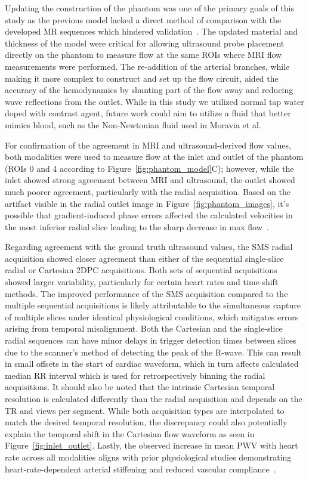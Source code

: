 Updating the construction of the phantom was one of the primary goals of this study as the previous model lacked a direct method of comparison with the developed MR sequences which hindered validation~\cite{robertsAdvancingFunctionalAssessment2023}. The updated material and thickness of the model were critical for allowing ultrasound probe placement directly on the phantom to measure flow at the same ROIs where MRI flow measurements were performed. The re-addition of the arterial branches, while making it more complex to construct and set up the flow circuit, aided the accuracy of the hemodynamics by shunting part of the flow away and reducing wave reflections from the outlet. While in this study we utilized normal tap water doped with contrast agent, future work could aim to utilize a fluid that better mimics blood, such as the Non-Newtonian fluid used in Moravia et al\cite{moraviaVitroFlowStudy2022}. 

For confirmation of the agreement in MRI and ultrasound-derived flow values, both modalities were used to measure flow at the inlet and outlet of the phantom (ROIs 0 and 4 according to Figure~\ref{fig:phantom_model}C); however, while the inlet showed strong agreement between MRI and ultrasound, the outlet showed much poorer agreement, particularly with the radial acquisition. Based on the artifact visible in the radial outlet image in Figure~\ref{fig:phantom_images}, it's possible that gradient-induced phase errors affected the calculated velocities in the most inferior radial slice leading to the sharp decrease in max flow~\cite{moraviaVitroFlowStudy2022}.

Regarding agreement with the ground truth ultrasound values, the SMS radial acquisition showed closer agreement than either of the sequential single-slice radial or Cartesian 2DPC acquisitions. Both sets of sequential acquisitions showed larger variability, particularly for certain heart rates and time-shift methods. The improved performance of the SMS acquisition compared to the multiple sequential acquisitions is likely attributable to the simultaneous capture of multiple slices under identical physiological conditions, which mitigates errors arising from temporal misalignment. Both the Cartesian and the single-slice radial sequences can have minor delays in trigger detection times between slices due to the scanner's method of detecting the peak of the R-wave. This can result in small offsets in the start of cardiac waveform, which in turn affects calculated median RR interval which is used for retrospectively binning the radial acquisitions\@. It should also be noted that the intrinsic Cartesian temporal resolution is calculated differently than the radial acquisition and depends on the TR and views per segment. While both acquisition types are interpolated to match the desired temporal resolution, the discrepancy could also potentially explain the temporal shift in the Cartesian flow waveform as seen in Figure~\ref{fig:inlet_outlet}. Lastly, the observed increase in mean PWV with heart rate across all modalities aligns with prior physiological studies demonstrating heart-rate-dependent arterial stiffening and reduced vascular compliance~\cite{moraviaVitroFlowStudy2022}. 

